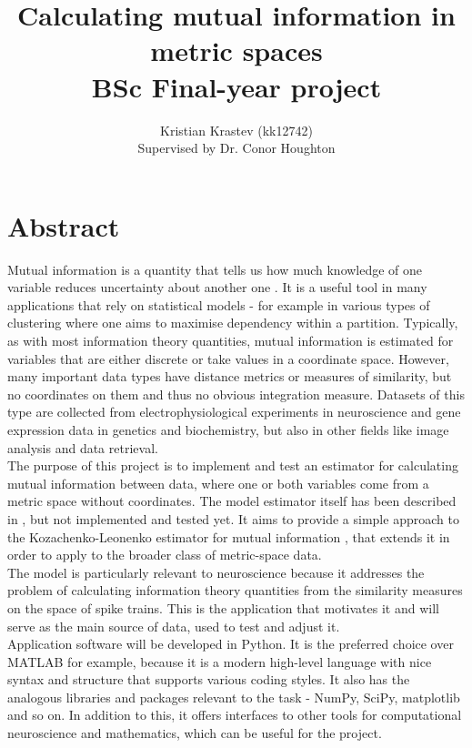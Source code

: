 \documentclass[12pt]{extarticle}
\title {\bf Calculating mutual information in metric spaces \\ BSc Final-year project}
\author{\large Kristian Krastev (kk12742) \\ Supervised by Dr. Conor Houghton}
\date{}
\begin{document}
\maketitle
\newpage
\tableofcontents

\newpage
{}
\section*{Abstract}
\noindent
Mutual information is a quantity that tells us how much knowledge of
one variable reduces uncertainty about another one \cite{Thomas, Shannon}.
It is a useful tool in many applications that rely on
statistical models - for example in various types of clustering where
one aims to maximise dependency within a partition. Typically, as with
most information theory quantities, mutual information is estimated
for variables that are either discrete or take values in a coordinate
space. However, many important data types have distance metrics or
measures of similarity, but no coordinates on them and thus no obvious
integration measure. Datasets of this type are collected from
electrophysiological experiments in neuroscience and gene expression
data in genetics and biochemistry, but also in other fields like image
analysis and data retrieval.\\

\noindent
The purpose of this project is to implement and test an estimator for
calculating mutual information between data, where one or both variables come
from a metric space without coordinates. The model estimator itself has been
described in \cite{Houghton}, but not implemented and tested yet. It aims to
provide a simple approach to the Kozachenko-Leonenko estimator for
mutual information \cite{Kozachenko-Leonenko}, that extends it in order to apply to the broader
class of metric-space data.\\

\noindent
The model is particularly relevant to neuroscience because it addresses the
problem of calculating information theory quantities from the similarity
measures on the space of spike trains. This is the application that motivates it
and will serve as the main source of data, used to test and adjust it.\\

\noindent
Application software will be developed in Python. It is the preferred choice
over MATLAB for example, because it is a modern high-level language with nice
syntax and structure that supports various coding styles. It also has the
analogous libraries and packages relevant to the task - NumPy, SciPy, matplotlib
and so on. In addition to this, it offers interfaces to other tools for computational
neuroscience and mathematics, which can be useful for the project.\\
\end{document}
